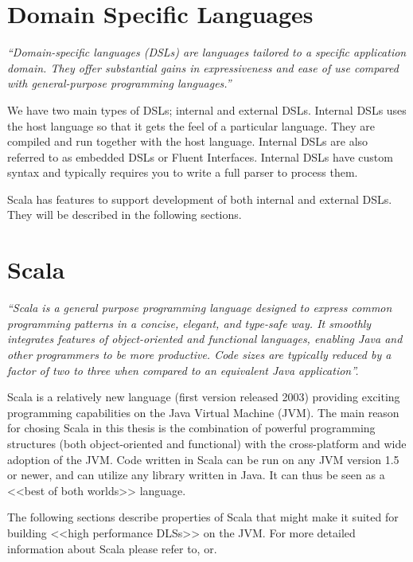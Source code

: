 \documentclass[a4paper,english]{report}
\begin{document}
\chapter{Domain Specific Languages}
\label{sec:dsls}

\textit{``Domain-specific languages (DSLs) are languages tailored to a
  specific application domain. They offer substantial gains in
  expressiveness and ease of use compared with general-purpose
  programming languages.''}\cite{mer05}

We have two main types of DSLs; internal and external DSLs. Internal
DSLs uses the host language so that it gets the feel of a particular
language. They are compiled and run together with the host
language. Internal DSLs are also referred to as embedded DSLs or
Fluent Interfaces. Internal DSLs have custom syntax and typically
requires you to write a full parser to process them.

Scala has features to support development of both internal and
external DSLs. They will be described in the following sections.

\chapter{Scala}
\label{sec:scala}

\textit{``Scala is a general purpose programming language designed to
  express common programming patterns in a concise, elegant, and
  type-safe way. It smoothly integrates features of object-oriented
  and functional languages, enabling Java and other programmers to be
  more productive. Code sizes are typically reduced by a factor of two
  to three when compared to an equivalent Java
  application''.}\cite{scala}

Scala is a relatively new language (first version released
2003\cite{scala}) providing exciting programming capabilities on the
Java Virtual Machine (JVM). The main reason for chosing Scala in this
thesis is the combination of powerful programming structures (both
object-oriented and functional) with the cross-platform and wide
adoption of the JVM. Code written in Scala can be run on any JVM
version 1.5 or newer, and can utilize any library written in Java. It
can thus be seen as a <<best of both worlds>> language.

The following sections describe properties of Scala that might make it
suited for building <<high performance DLSs>> on the JVM. For more
detailed information about Scala please refer
to\cite{ode08},\cite{scala} or\cite{scalatour}.
\end{document}

